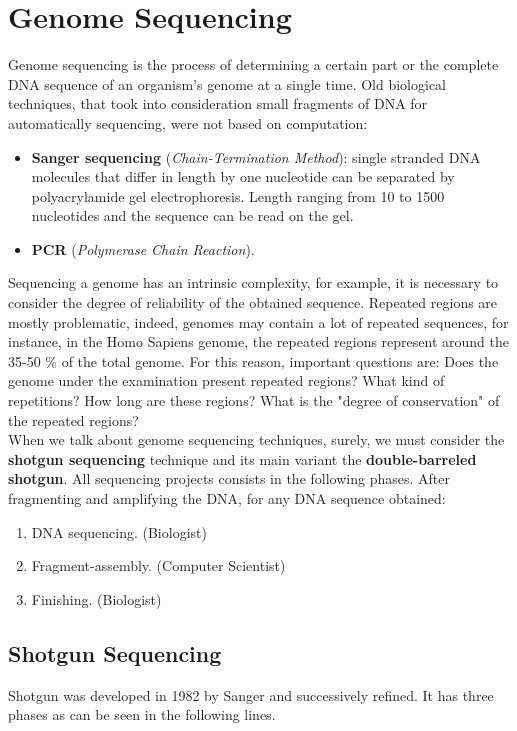 \chapter{Genome Sequencing}
Genome sequencing is the process of determining a certain part or the complete DNA sequence of an organism's genome at a single time. Old biological techniques, that took into consideration small fragments of DNA for automatically sequencing, were not based on computation:
\begin{itemize}
	\item \textbf{Sanger sequencing} (\textit{Chain-Termination Method}): single stranded DNA molecules that differ in length by one nucleotide can be separated by polyacrylamide gel electrophoresis. Length ranging from 10 to 1500 nucleotides and the sequence can be read on the gel.
	\item \textbf{PCR} (\textit{Polymerase Chain Reaction}).
\end{itemize}

Sequencing a genome has an intrinsic complexity, for example, it is necessary to consider the degree of reliability of the obtained sequence. Repeated regions are mostly problematic, indeed, genomes may contain a lot of repeated sequences, for instance, in the Homo Sapiens genome, the repeated regions represent around the 35-50 \% of the total genome. For this reason, important questions are: Does the genome under the examination present repeated regions? What kind of repetitions? How long are these regions? What is the "degree of conservation" of the repeated regions?\\
When we talk about genome sequencing techniques, surely, we must consider the \textbf{shotgun sequencing} technique and its main variant the \textbf{double-barreled shotgun}. All sequencing projects consists in the following phases. After fragmenting and amplifying the DNA, for any DNA sequence obtained:
\begin{enumerate}
	\item DNA sequencing. (Biologist)
	\item Fragment-assembly. (Computer Scientist)
	\item Finishing. (Biologist)
\end{enumerate}

\section{Shotgun Sequencing}
Shotgun was developed in 1982 by Sanger and successively refined. It has three phases as can be seen in the following lines.
